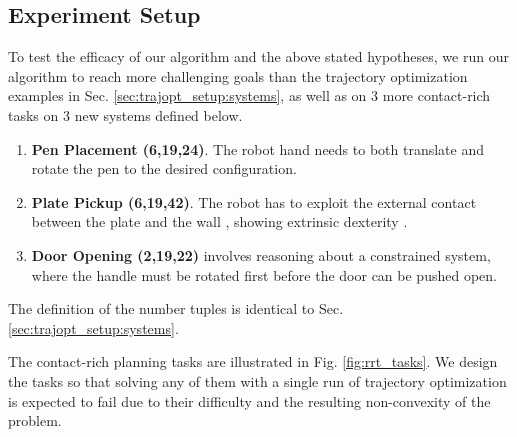 \subsection{Experiment Setup \label{sec:rrt_experiment_setup}} 
To test the efficacy of our algorithm and the above stated hypotheses, we run our algorithm to reach more challenging goals than the trajectory optimization examples in Sec. \ref{sec:trajopt_setup:systems}, as well as on 3 more contact-rich tasks on 3 new systems defined below.
\begin{enumerate}
    \item {\bf Pen Placement (6,19,24)}. The robot hand needs to both translate and rotate the pen \cite{rajeswaran2018learning} to the desired configuration.
    \item {\bf Plate Pickup (6,19,42)}. The robot has to exploit the external contact between the plate and the wall \cite{cheng2021contact}, showing extrinsic dexterity \cite{extrinsic}.
    \item {\bf Door Opening (2,19,22)} \cite{rajeswaran2018learning} involves reasoning about a constrained system, where the handle must be rotated first before the door can be pushed open.
\end{enumerate}
The definition of the number tuples is identical to Sec.\ref{sec:trajopt_setup:systems}.

The contact-rich planning tasks are illustrated in Fig. \ref{fig:rrt_tasks}.
We design the tasks so that solving any of them with a single run of trajectory optimization is expected to fail due to their difficulty and the resulting non-convexity of the problem. 


